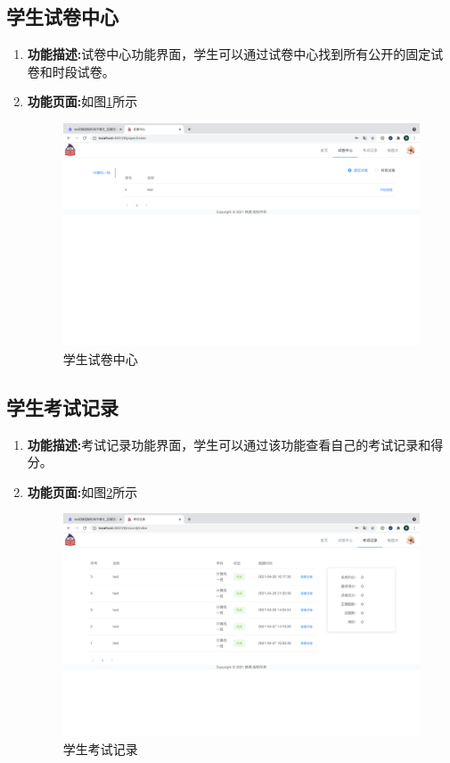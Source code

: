 \subsection{学生试卷中心}
\begin{enumerate}
	\item[] \textbf{功能描述:}试卷中心功能界面，学生可以通过试卷中心找到所有公开的固定试卷和时段试卷。
	\item[] \textbf{功能页面:}如图\ref{figure:szhongxin}所示 \\
		\begin{figure}[H]
			\centering
			\includegraphics[width=1.0\textwidth,keepaspectratio]{data/chapter-5/student/shijuanzhongxin.png}
			\caption{学生试卷中心}
			\label{figure:szhongxin}
		\end{figure}
\end{enumerate}

\subsection{学生考试记录}
\begin{enumerate}
	\item[] \textbf{功能描述:}考试记录功能界面，学生可以通过该功能查看自己的考试记录和得分。
	\item[] \textbf{功能页面:}如图\ref{figure:sjilu}所示 \\
		\begin{figure}[H]
			\centering
			\includegraphics[width=1.0\textwidth,keepaspectratio]{data/chapter-5/student/kaoshijilu.png}
			\caption{学生考试记录}
			\label{figure:sjilu}
		\end{figure}
\end{enumerate}

